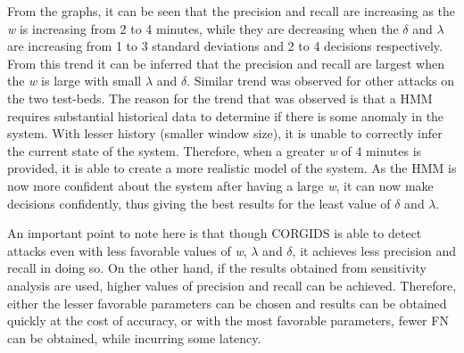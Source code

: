 From the graphs, it can be seen that the precision and recall are increasing as the \textit{w} is increasing from 2 to 4 minutes, while they are decreasing when the $\delta$ and $\lambda$ are increasing from 1 to 3 standard deviations and 2 to 4 decisions respectively. From this trend it can be inferred that the precision and recall are largest when the \textit{w} is large with small $\lambda$ and $\delta$. Similar trend was observed for other attacks on the two test-beds. The reason for the trend that was observed is that a \ac{HMM} requires substantial historical data to determine if there is some anomaly in the system. With lesser history (smaller window size), it is unable to correctly infer the current state of the system. Therefore, when a greater \textit{w} of 4 minutes is provided, it is able to create a more realistic model of the system. As the \ac{HMM} is now more confident about the system after having a large \textit{w}, it can now make decisions confidently, thus giving the best results for the least value of $\delta$ and $\lambda$.


An important point to note here is that though \ac{CORGIDS} is able to detect attacks even with less favorable values of \textit{w}, $\lambda$ and $\delta$, it achieves less precision and recall in doing so. On the other hand, if the results obtained from sensitivity analysis are used, higher values of precision and recall can be achieved. Therefore, either the lesser favorable parameters can be chosen and results can be obtained quickly at the cost of accuracy, or with the most favorable parameters, fewer \ac{FN} can be obtained, while incurring some latency.


